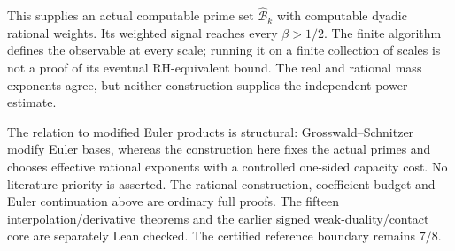 \documentclass[11pt]{article}
\theoremstyle{definition}
\begin{document}
This supplies an actual computable prime set
$\widehat{\mathcal B}_k$ with computable dyadic rational weights.
Its weighted signal reaches every $\beta>1/2$.
The finite algorithm defines the observable at every scale;
running it on a finite collection of scales is not a proof
of its eventual RH-equivalent bound.
The real and rational mass exponents agree, but neither
construction supplies the independent power estimate.

The relation to modified Euler products is structural:
Grosswald--Schnitzer~\cite{GrosswaldSchnitzer} modify Euler
bases, whereas the construction here fixes the actual primes
and chooses effective rational exponents with a controlled
one-sided capacity cost. No literature priority is asserted.
The rational construction, coefficient budget and Euler
continuation above are ordinary full proofs. The fifteen
interpolation/derivative theorems and the earlier signed
weak-duality/contact core are separately Lean checked.
The certified reference boundary remains $7/8$.
\end{document}
